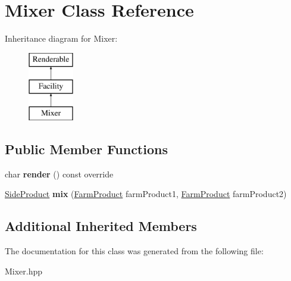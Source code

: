 \hypertarget{class_mixer}{}\section{Mixer Class Reference}
\label{class_mixer}
Inheritance diagram for Mixer\+:\begin{figure}[H]
\begin{center}
\leavevmode
\includegraphics[height=3.000000cm]{class_mixer}
\end{center}
\end{figure}
\subsection*{Public Member Functions}
\begin{DoxyCompactItemize}
\item 
\mbox{\label{class_mixer_a6e934b686923fe1dc274a260421b8991}} 
char {\bfseries render} () const override
\item 
\mbox{\label{class_mixer_a9498a0ebf96a41f4fcfead28d7b282c4}} 
\mbox{\hyperlink{class_side_product}{Side\+Product}} {\bfseries mix} (\mbox{\hyperlink{class_farm_product}{Farm\+Product}} farm\+Product1, \mbox{\hyperlink{class_farm_product}{Farm\+Product}} farm\+Product2)
\end{DoxyCompactItemize}
\subsection*{Additional Inherited Members}


The documentation for this class was generated from the following file\+:\begin{DoxyCompactItemize}
\item 
Mixer.\+hpp\end{DoxyCompactItemize}
